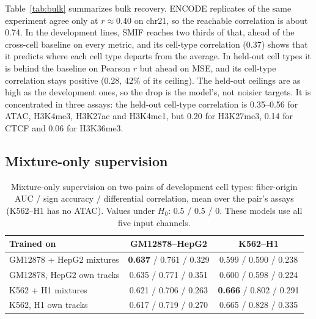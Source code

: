 \documentclass[acmtog,nonacm]{acmart}   %
\begin{document}
Table~\ref{tab:bulk} summarizes bulk recovery. ENCODE replicates of the same experiment agree only at $r\approx0.40$
on chr21, so the reachable correlation is about 0.74. In the development lines, SMIF reaches two thirds of that,
ahead of the cross-cell baseline on every metric, and its cell-type correlation (0.37) shows that it predicts where
each cell type departs from the average. In held-out cell types it is behind the baseline on Pearson $r$ but ahead
on MSE, and its cell-type correlation stays positive (0.28, 42\% of its ceiling). The held-out ceilings are as high
as the development ones, so the drop is the model's, not noisier targets. It is concentrated in three assays: the
held-out cell-type correlation is 0.35--0.56 for ATAC, H3K4me3, H3K27ac and H3K4me1, but 0.20 for H3K27me3, 0.14 for
CTCF and 0.06 for H3K36me3.

\subsection{Mixture-only supervision}
\label{sec:res-mixture}

\begin{table}[t]
\caption{Mixture-only supervision on two pairs of development cell types: fiber-origin AUC / sign accuracy /
differential correlation, mean over the pair's assays (K562--H1 has no ATAC). Values under $H_0$: 0.5 / 0.5 / 0.
These models use all five input channels.}
\label{tab:mixture}
\footnotesize
\begin{tabular}{@{}lcc@{}}
\toprule
Trained on & GM12878--HepG2 & K562--H1 \\
\midrule
GM12878 + HepG2 mixtures & \textbf{0.637} / 0.761 / 0.329 & 0.599 / 0.590 / 0.238 \\
GM12878, HepG2 own tracks & 0.635 / 0.771 / 0.351 & 0.600 / 0.598 / 0.224 \\
K562 + H1 mixtures & 0.621 / 0.706 / 0.263 & \textbf{0.666} / 0.802 / 0.291 \\
K562, H1 own tracks & 0.617 / 0.719 / 0.270 & 0.665 / 0.828 / 0.335 \\
\bottomrule
\end{tabular}
\end{table}
\end{document}
